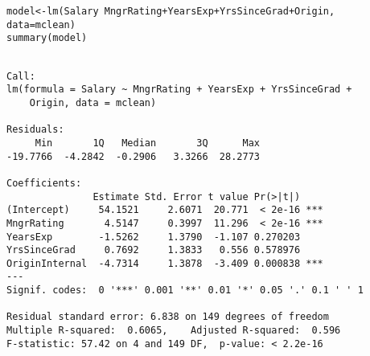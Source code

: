 \documentclass{beamer}\usepackage[]{graphicx}\usepackage[]{color}
\makeatletter
\newcommand{\hlopt}[1]{\textcolor[rgb]{1,0.894,0.769}{#1}}%
\newcommand{\hlstd}[1]{\textcolor[rgb]{1,0.894,0.769}{#1}}%
\newcommand{\hlkwb}[1]{\textcolor[rgb]{0.804,0.776,0.451}{#1}}%
\newcommand{\hlkwc}[1]{\textcolor[rgb]{0.78,0.941,0.545}{#1}}%
\newcommand{\hlkwd}[1]{\textcolor[rgb]{1,0.78,0.769}{#1}}%
\newenvironment{kframe}{%
 \def\at@end@of@kframe{}%
 \ifinner\ifhmode%
  \def\at@end@of@kframe{\end{minipage}}%
  \begin{minipage}{\columnwidth}%
 \fi\fi%
 \def\FrameCommand##1{\hskip\@totalleftmargin \hskip-\fboxsep
 \colorbox{shadecolor}{##1}\hskip-\fboxsep
     \hskip-\linewidth \hskip-\@totalleftmargin \hskip\columnwidth}%
 \MakeFramed {\advance\hsize-\width
   \@totalleftmargin\z@ \linewidth\hsize
   \@setminipage}}%
 {\par\unskip\endMakeFramed%
 \at@end@of@kframe}
\newenvironment{knitrout}{}{} %
\makeatother
\begin{document}
\begin{darkframes}
\begin{frame}[fragile]
\begin{knitrout}
\end{knitrout}
    \end{frame}

    \begin{frame}[fragile]%
      \fontsize{8}{8}\selectfont
\begin{knitrout}
\begin{kframe}
\begin{alltt}
\hlstd{model} \hlkwb{<-} \hlkwd{lm}\hlstd{(Salary} \hlopt{~} \hlstd{MngrRating} \hlopt{+} \hlstd{YearsExp} \hlopt{+} \hlstd{YrsSinceGrad} \hlopt{+} \hlstd{Origin,}
           \hlkwc{data}\hlstd{=mclean)}
\hlkwd{summary}\hlstd{(model)}
\end{alltt}
\begin{verbatim}

Call:
lm(formula = Salary ~ MngrRating + YearsExp + YrsSinceGrad + 
    Origin, data = mclean)

Residuals:
     Min       1Q   Median       3Q      Max 
-19.7766  -4.2842  -0.2906   3.3266  28.2773 

Coefficients:
               Estimate Std. Error t value Pr(>|t|)    
(Intercept)     54.1521     2.6071  20.771  < 2e-16 ***
MngrRating       4.5147     0.3997  11.296  < 2e-16 ***
YearsExp        -1.5262     1.3790  -1.107 0.270203    
YrsSinceGrad     0.7692     1.3833   0.556 0.578976    
OriginInternal  -4.7314     1.3878  -3.409 0.000838 ***
---
Signif. codes:  0 '***' 0.001 '**' 0.01 '*' 0.05 '.' 0.1 ' ' 1

Residual standard error: 6.838 on 149 degrees of freedom
Multiple R-squared:  0.6065,	Adjusted R-squared:  0.596 
F-statistic: 57.42 on 4 and 149 DF,  p-value: < 2.2e-16
\end{verbatim}
\end{kframe}
\end{knitrout}
    \end{frame}



\end{darkframes}
\end{document}

